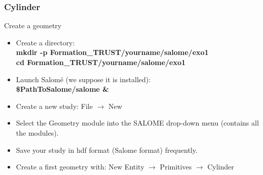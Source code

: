 \documentclass[10pt, hyperref={unicode=true,pdfusetitle, bookmarks=true,bookmarksnumbered=false,bookmarksopen=false, breaklinks=false,pdfborder={0 0 1},backref=true,colorlinks=true,linkcolor=darkblue,pageanchor}]{beamer}
\begin{document}
\begin{frame}
\frametitle{Cylinder}
\begin{block}{Create a geometry}

\begin{itemize}
\item Create a directory:\\
\textbf{mkdir -p Formation\_TRUST/yourname/salome/exo1} \\
\textbf{cd Formation\_TRUST/yourname/salome/exo1} \\

\item Launch Salom\'e (we suppose it is installed):\\
\textbf{\$PathToSalome/salome \&} 

\item Create a new study: File $\rightarrow$ New

\item Select the Geometry module into the SALOME drop-down menu (contains all the modules).

\item Save your study in hdf format (Salome format) frequently.

\item Create a first geometry with: New Entity $\rightarrow$ Primitives $\rightarrow$ Cylinder
\end{itemize}

\end{block}
\end{frame}
\end{document}
